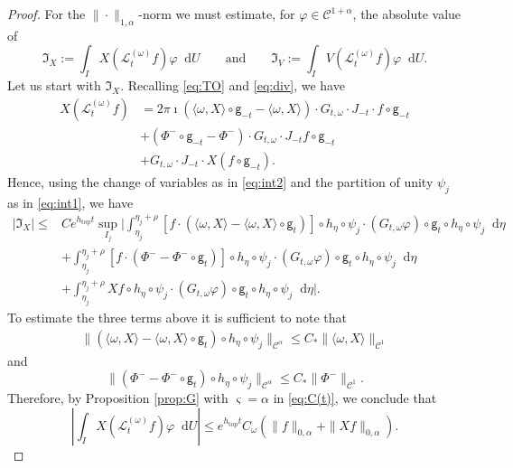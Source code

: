 \documentclass[11pt,letterpaper]{amsart}
\newcommand \cL {{\mathcal L}}
\newcommand \cC {{\mathscr{C}}}
\newcommand{\geo}{\mathsf{g}}
\newcommand*{\diff}{\mathop{}\!\mathrm{d}}
\DeclareMathOperator{\topp}{top}
\theoremstyle{definition}
\begin{document}
\begin{proof}
For the $\|\cdot\|_{1,\alpha}$-norm we must estimate, for $\varphi\in \cC^{1+\alpha}$, the absolute value of
\[
\mathfrak{I}_X:=\int_{I} X(\cL^{(\omega)}_tf)\varphi \diff U \qquad \text{and} \qquad \mathfrak{I}_V:= \int_{I} V(\cL^{(\omega)}_tf)\varphi \diff U.
\]
Let us start with  $\mathfrak{I}_X$. Recalling \eqref{eq:TO} and \eqref{eq:div}, we have
\begin{equation}\label{eq:I_X}
\begin{split}
X(\cL^{(\omega)}_tf)&=2\pi \imath (\langle \omega, X \rangle \circ \geo_{-t}-\langle \omega, X \rangle) \cdot G_{t,\omega}\cdot J_{-t}\cdot f\circ \geo_{-t}\\
%
&+ ({\Phi^-}\circ \geo_{-t} -{\Phi^-})\cdot G_{t,\omega} \cdot J_{-t}f\circ \geo_{-t}\\
%
&+G_{t,\omega} \cdot J_{-t} \cdot  X(f\circ \geo_{-t}).
\end{split}
\end{equation}
Hence, using the change of variables as in \eqref{eq:int2} and  the partition of unity $\psi_j$ as in \eqref{eq:int1}, we have
\[
\begin{split}
|\mathfrak I_X | \le & Ce^{h_{\topp}t}\sup_{I_j} \bigg|  \int_{\eta_j}^{\eta_j+\rho} [f\cdot (\langle \omega, X \rangle- \langle \omega, X \rangle \circ \geo_t )]\circ h_\eta \circ \psi_j \cdot (G_{t,\omega}\varphi)\circ \geo_t\circ h_\eta \circ \psi_j\diff \eta   \\
%
&+ \int_{\eta_j}^{\eta_j+\rho} [f\cdot ({\Phi^-} -{\Phi^-} \circ \geo_t)]\circ h_\eta \circ \psi_j \cdot (G_{t,\omega}\varphi)\circ \geo_t\circ h_\eta \circ \psi_j\diff \eta\\
%
&+\int_{\eta_j}^{\eta_j+\rho}  Xf \circ h_\eta \circ \psi_j \cdot (G_{t,\omega}\varphi)\circ \geo_t\circ h_\eta \circ \psi_j\diff \eta \bigg|.
\end{split}
\]
To estimate the three terms above it is sufficient to note that
\[
\begin{split}
\|(\langle \omega, X \rangle- \langle \omega, X \rangle \circ \geo_t )\circ h_\eta \circ \psi_j\|_{\cC^{\alpha}}\le C_*\|\langle \omega, X \rangle\|_{\cC^1}
\end{split}
\]
and
\[
\|({\Phi^-}-{\Phi^-} \circ \geo_t)\circ h_\eta \circ \psi_j\|_{\cC^\alpha} \le C_*\|{\Phi^-}\|_{\cC^1}.
\]
Therefore, by Proposition \ref{prop:G} with $\varsigma=\alpha$ in \eqref{eq:C(t)}, we conclude that
\begin{equation}\label{eq:J_X}
\left|  \int_{I} X(\cL^{(\omega)}_tf)\varphi \diff U \right|\le  e^{h_{\topp}t}C_\omega(\|f\|_{0,\alpha}+\|Xf\|_{0,\alpha}).
\end{equation}


\end{proof}
\end{document}
